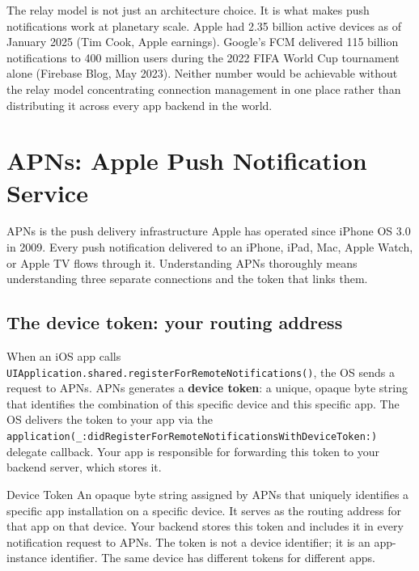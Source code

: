 \documentclass[11pt,a4paper]{article}
\begin{document}
\begin{insightbox}
The relay model is not just an architecture choice. It is what makes push notifications work at planetary scale. Apple had 2.35 billion active devices as of January 2025 (Tim Cook, Apple earnings). Google's FCM delivered 115 billion notifications to 400 million users during the 2022 FIFA World Cup tournament alone (Firebase Blog, May 2023). Neither number would be achievable without the relay model concentrating connection management in one place rather than distributing it across every app backend in the world.
\end{insightbox}

\section{APNs: Apple Push Notification Service}

APNs is the push delivery infrastructure Apple has operated since iPhone OS 3.0 in 2009. Every push notification delivered to an iPhone, iPad, Mac, Apple Watch, or Apple TV flows through it. Understanding APNs thoroughly means understanding three separate connections and the token that links them.

\subsection{The device token: your routing address}

When an iOS app calls \texttt{UIApplication.shared.registerForRemoteNotifications()}, the OS sends a request to APNs. APNs generates a \textbf{device token}: a unique, opaque byte string that identifies the combination of this specific device and this specific app. The OS delivers the token to your app via the \texttt{application(\_:\allowbreak{}didRegisterForRemoteNotificationsWithDeviceToken:)} delegate callback. Your app is responsible for forwarding this token to your backend server, which stores it.

\begin{termbox}{Device Token}
An opaque byte string assigned by APNs that uniquely identifies a specific app installation on a specific device. It serves as the routing address for that app on that device. Your backend stores this token and includes it in every notification request to APNs. The token is not a device identifier; it is an app-instance identifier. The same device has different tokens for different apps.
\end{termbox}
\end{document}
